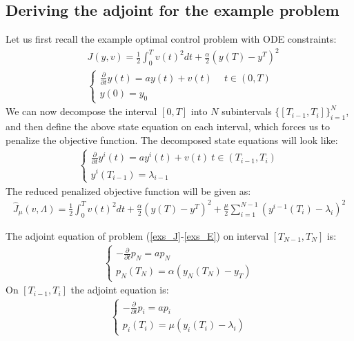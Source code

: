\subsection{Deriving the adjoint for the example problem}
Let us first recall the example optimal control problem with ODE constraints:
\begin{align*}
&J(y,v) = \frac{1}{2}\int_0^Tv(t)^2dt + \frac{\alpha}{2}(y(T)-y^T)^2 \\
&\left\{
     \begin{array}{lr}
       	\frac{\partial}{\partial t}y(t)=a y(t) + v(t) \ \quad t\in(0,T)\\
       	y(0)=y_0
     \end{array}
   \right.
\end{align*}
We can now decompose the interval $[0,T]$ into $N$ subintervals $\{[T_{i-1},T_{i}]\}_{i=1}^{N}$, and then define the above state equation on each interval, which forces us to penalize the objective function. The decomposed state equations will look like:
\begin{align}
\left\{
     \begin{array}{lr}
       	\frac{\partial}{\partial t} y^i(t)=a y^i(t) + v(t) \ t\in(T_{i-1},T_{i})\\
       	y^i(T_{i-1})=\lambda_{i-1}
     \end{array}
   \right. \label{decomp_E}
\end{align}
The reduced penalized objective function will be given as:
\begin{align}
\hat J_{\mu}(v,\Lambda) = \frac{1}{2}\int_0^Tv(t)^2dt + \frac{\alpha}{2}(y(T)-y^T)^2 + \frac{\mu}{2}\sum_{i=1}^{N-1}(y^{i-1}(T_i)-\lambda_i)^2 \label{penalty_func}
\end{align}
\begin{theorem}
The adjoint equation of problem (\ref{exs_J}-\ref{exs_E}) on interval $[T_{N-1},T_N]$ is:
\begin{align}
\left\{
     \begin{array}{lr}
	-\frac{\partial }{\partial t}p_N =a p_N  \\
	p_N(T_{N}) = \alpha( y_N(T_{N})-y_T)
	\end{array}
   \right. \label{end adjoint}
\end{align}
On $[T_{i-1},T_i]$ the adjoint equation is:
\begin{align}
\left\{
     \begin{array}{lr}
	-\frac{\partial }{\partial t}p_i =ap_i  \\
	p_i(T_{i}) = \mu(y_{i}(T_{i})-\lambda_{i} )
	\end{array}
   \right. \label{exs_adjoint}
\end{align}
\end{theorem} 
